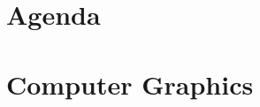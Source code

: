 \def \DefaultFontSize{10pt}

\def \PresTextLayout{2}

\def \templatepath{FH-Beamer-Template}


\def \PresTitle      {Graphics-programming with WebGPU}
\def \PresShortTitle {Graphics-programming}
\def \PresSubTitle   {Bachelor Mobile Computing, Summer Semester 2022}
\def \PresAuthor     {Shehata Abd El Rahaman}
\def \PresAuthorTitle{Shehata Abd El Rahaman}
\def \PresHeading    {}
\def \PresFooter     {WebGPU}

\def \IntroImage     {assets/me.png}
\def \IntroImageXPos {30}
\def \IntroImageHeight{3cm}
\def \IntroImageText {A picture of me}

\newfontscheme

\usepackage{animate}
\usepackage{media9}
\usepackage{hyperref}
\usepackage{fontspec}

\newfontfamily{}



\fhfirstslide

\section{Agenda}

\section{Computer Graphics}
